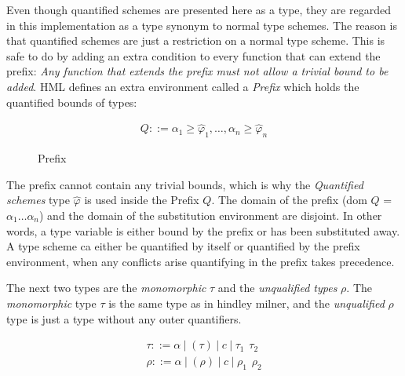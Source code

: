 \documentclass[twoside, titlepage, openright, a4paper]{book}
\renewcommand{\geq}{\geqslant}
\begin{document}
Even though quantified schemes are presented here as a type, they are regarded in this implementation as a type synonym to normal type schemes. The reason is that quantified schemes are just a restriction on a normal type scheme. This is safe to do by adding an extra condition to every function that can extend the prefix: \emph{Any function that extends the prefix must not allow a trivial bound to be added}.
HML defines an extra environment called a \emph{Prefix} which holds the quantified bounds of types:

\begin{figure}[H]
\begin{eqnarray*}
Q ::= \alpha_1\geq\hat{\varphi}_1,\ldots,\alpha_n\geq\hat{\varphi}_n
\end{eqnarray*}
\caption{Prefix}
\label{Prefix}
\end{figure}

The prefix cannot contain any trivial bounds, which is why the \emph{Quantified schemes} type $\hat{\varphi}$ is used inside the Prefix $Q$. The domain of the prefix (dom $Q$ = ${\alpha_1 \ldots \alpha_n}$) and the domain of the substitution environment are disjoint. In other words, a type variable is either bound by the prefix or has been substituted away. A type scheme ca either be quantified by itself or quantified by the prefix environment, when any conflicts arise quantifying in the prefix takes precedence.

The next two types are the \emph{monomorphic} $\tau$ and the \emph{unqualified types} $\rho$. The \emph{monomorphic} type $\tau$ is the same type as in hindley milner, and the \emph{unqualified} $\rho$ type is just a type without any outer quantifiers. 

\begin{eqnarray*}
\tau  ::= \alpha \hspace{3pt} | \hspace{3pt} (\tau) \hspace{3pt} | \hspace{3pt} c \hspace{3pt} | \hspace{3pt} \tau_1 \hspace{5pt} \tau_2 \\
\rho  ::= \alpha \hspace{3pt} | \hspace{3pt} (\rho) \hspace{3pt} | \hspace{3pt} c \hspace{3pt} | \hspace{3pt} \rho_1 \hspace{5pt} \rho_2
\end{eqnarray*}
\end{document}

